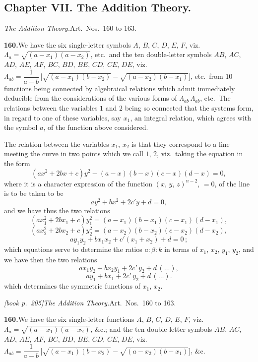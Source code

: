 \documentclass[11pt,a4paper]{article}
\begin{document}
\subsection*{Chapter VII. The Addition Theory.}

\medskip\noindent\textit{The Addition Theory.}\quad Art.\ Nos.\ 160 to 163.

\medskip\noindent\textbf{160.}\quad We have the six single-letter symbols $A$, $B$, $C$, $D$, $E$, $F$, viz.\ $\Lambda_a = \sqrt{(a - x_1)(a - x_2)}$, etc.\ and the ten double-letter symbols $AB$, $AC$, $AD$, $AE$, $AF$, $BC$, $BD$, $BE$, $CD$, $CE$, $DE$, viz.\ $\Lambda_{ab} = \dfrac{1}{a - b}\,\bigl[\sqrt{(a - x_1)(b - x_2)} - \sqrt{(a - x_2)(b - x_1)}\bigr]$, etc.\ from $10$ functions being connected by algebraical relations which admit immediately deducible from the considerations of the various forms of $\Lambda_{ab}\,\Lambda_{ab}$, etc.\ The relations between the variables $1$ and $2$ being so connected that the systems form, in regard to one of these variables, say $x_1$, an integral relation, which agrees with the symbol $a$, of the function above considered.

The relation between the variables $x_1$, $x_2$ is that they correspond to a line meeting the curve in two points which we call $1$, $2$, viz.\ taking the equation in the form
\[
(ax^2 + 2bx + c)y^2 - (a - x)(b - x)(c - x)(d - x) = 0,
\]
where it is a character expression of the function $(x,\,y,\,z)^{n-2}$, $= 0$, of the line is to be taken to be
\[
ay^2 + bx^2 + 2c'y + d = 0,
\]
and we have thus the two relations
\[
(ax_1^2 + 2bx_1 + c)y_1^2 = (a - x_1)(b - x_1)(c - x_1)(d - x_1),
\]
\[
(ax_2^2 + 2bx_2 + c)y_2^2 = (a - x_2)(b - x_2)(c - x_2)(d - x_2),
\]
\[
ay_1y_2 + bx_1x_2 + c'(x_1 + x_2) + d = 0\,;
\]
which equations serve to determine the ratios $a : \beta : k$ in terms of $x_1$, $x_2$, $y_1$, $y_2$, and we have then the two relations
\[
ax_1y_2 + bx_2y_1 + 2c'\,y_2 + d\,(\ldots),
\]
\[
ay_1 + bx_1 + 2c'\,y_2 + d\,(\ldots).
\]
which determines the symmetric functions of $x_1$, $x_2$.

\medskip\noindent\textit{[book p.~205]}\quad \textit{The Addition Theory.}\quad Art.\ Nos.\ 160 to 163.

\medskip\noindent\textbf{160.}\quad We have the six single-letter functions $A$, $B$, $C$, $D$, $E$, $F$, viz.\ $\Lambda_a = \sqrt{(a - x_1)(a - x_2)}$, $\&\text{c.;}$ and the ten double-letter symbols $AB$, $AC$, $AD$, $AE$, $AF$, $BC$, $BD$, $BE$, $CD$, $CE$, $DE$, viz.\ $\Lambda_{ab} = \dfrac{1}{a - b}\,\bigl[\sqrt{(a - x_1)(b - x_2)} - \sqrt{(a - x_2)(b - x_1)}\bigr]$, $\&\text{c.}$
\end{document}

